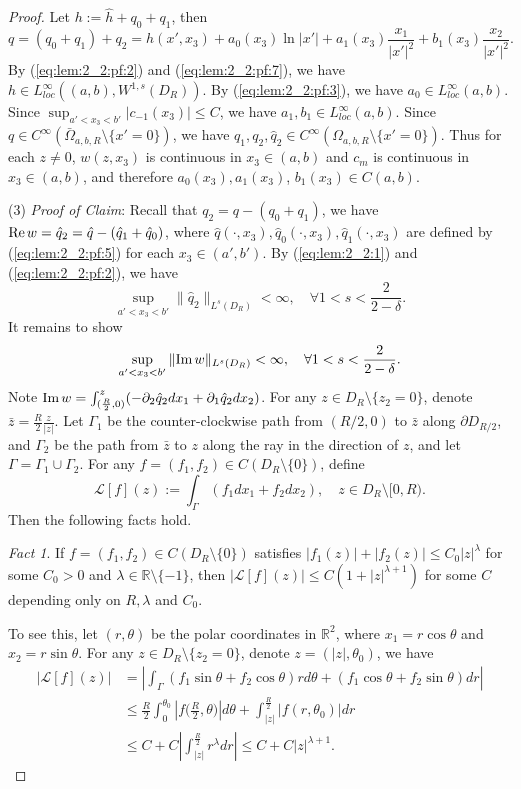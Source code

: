 \documentclass[12pt]{article}
\newcommand{\Real}{{\rm Re \hspace{0.05cm} }}
\newcommand{\Imagine}{{\rm Im \hspace{0.05cm} }}
\begin{document}
\begin{proof}
	Let $h:=\hat{h}+q_0+q_1$, then
	\[
		q=(q_0+q_1)+q_2=h(x', x_3)+a_0(x_3)\ln |x'|+a_1(x_3)\frac{x_1}{|x'|^2}+b_1(x_3)\frac{x_2}{|x'|^2}. 
	\]
	By (\ref{eq:lem:2_2:pf:2}) and (\ref{eq:lem:2_2:pf:7}), we have $h\in L^{\infty}_{loc}((a, b), W^{1, s}(D_R))$. By (\ref{eq:lem:2_2:pf:3}), we have $a_0\in L^{\infty}_{loc}(a, b)$. Since $\sup_{a'<x_3<b'}|c_{-1}(x_3)|\le C$, we have $a_1, b_1\in L^{\infty}_{loc}(a, b)$. Since $q\in C^{\infty}(\bar{\Omega}_{a, b, R}\setminus\{x'=0\})$, we have $q_1, q_2, \hat{q}_2\in C^{\infty} (\Omega_{a, b, R}\setminus\{x'=0\})$. Thus for each $z\ne 0$, $w(z, x_3)$ is continuous in $x_3\in (a, b)$ and $c_m$ is continuous in $x_3\in (a, b)$, and therefore $a_0(x_3), a_1(x_3)$, $b_1(x_3)\in C(a, b)$. 

	(3)	\noindent\emph{Proof of Claim}: 
	Recall that $q_2=q-(q_0+q_1)$, we have $\Real w=\hat{q}_2=\hat{q}-(\hat{q}_1+\hat{q}_0)$, where $\hat{q}(\cdot, x_3), \hat{q}_0(\cdot, x_3), \hat{q}_1(\cdot, x_3)$ are defined by (\ref{eq:lem:2_2:pf:5}) for each $x_3\in (a', b')$. By (\ref{eq:lem:2_2:1}) and (\ref{eq:lem:2_2:pf:2}), we have 
	\[
		\sup_{a'<x_3<b'}\|\hat{q}_2\|_{L^s(D_R)}
		<\infty, \quad \forall 1<s<\frac{2}{2-\delta}. 
	\]
	It remains to show 
	\begin{equation}\label{eq:lem:2_2:pf:8}
		\sup_{a'<x_3<b'} \|\Imagine w\|_{L^{s}(D_{R})}<\infty, \quad \forall 1<s<\frac{2}{2-\delta}.
	\end{equation} 
	Note $\Imagine w=\int_{(\frac{R}{2}, 0)}^z(-\partial_2\hat{q}_2 dx_1+\partial_1\hat{q}_2dx_2)$. For any $z\in D_R\setminus \{z_2=0\}$, denote $\bar{z}=\frac{R}{2}\frac{z}{|z|}$. Let $\Gamma_1$ be the counter-clockwise path from $(R/2, 0)$ to $\bar{z}$ along $\partial D_{R/2}$, and $\Gamma_2$ be the path from $\bar{z}$ to $z$ along the ray in the direction of $z$, and let $\Gamma=\Gamma_1\cup\Gamma_2$. For any $f=(f_1, f_2)\in C(D_R\setminus\{0\})$, define
	\begin{equation*}
		\mathcal{L}[f](z) := \int_{\Gamma}(f_1dx_1+f_2dx_2), \quad z\in D_R\setminus [0, R). 
	\end{equation*}
	Then the following facts hold.

	\noindent\emph{Fact 1}. If $f=(f_1, f_2)\in C(D_R\setminus\{0\})$ satisfies $|f_1(z)|+|f_2(z)|\le C_0|z|^{\lambda}$ for some $C_0>0$ and $\lambda\in\mathbb{R}\setminus\{-1\}$, then $|\mathcal{L}[f](z)|\le C(1+|z|^{\lambda+1})$ for some $C$ depending only on $R, \lambda$ and $C_0$. 
	
	To see this, let $(r, \theta)$ be the polar coordinates in $\mathbb{R}^2$, where $x_1=r\cos\theta$ and $x_2=r\sin\theta$. For any $z\in D_R\setminus \{z_2=0\}$, denote $z=(|z|, \theta_0)$, we have 
	\[
	\begin{split}
		|\mathcal{L}[f](z)| & =|\int_{\Gamma}(f_1\sin\theta+f_2\cos\theta)rd\theta+(f_1\cos\theta+f_2\sin\theta)dr|\\
		& \le \frac{R}{2}\int_{0}^{\theta_0}|f\big(\frac{R}{2}, \theta\big)|d\theta 
		+\int_{|z|}^{\frac{R}{2}}|f(r, \theta_0)|dr\\
		& 
		\le C+C|\int_{|z|}^{\frac{R}{2}}r^{\lambda}dr| 
		\le C+C|z|^{\lambda+1}.
	\end{split}
	\]
	

\end{proof}
\end{document}
